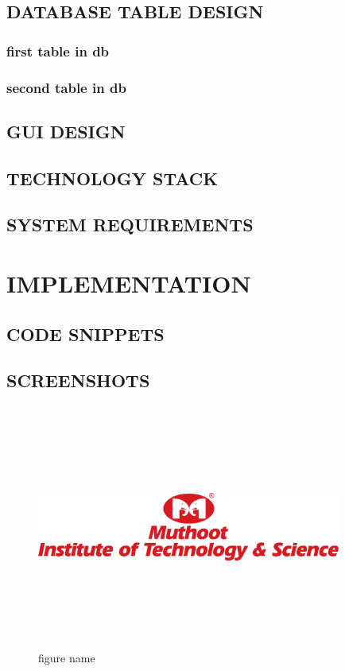 \documentclass[a4paper,12pt,oneside]{report}  %
\begin{document}
  
\newpage
\section{DATABASE TABLE DESIGN}
\subsection{first table in db}

\subsection{second table in db}




\section{GUI DESIGN}

\section{TECHNOLOGY STACK}

\section{SYSTEM REQUIREMENTS}


\chapter{IMPLEMENTATION}
\vspace{-1 cm}

\section{CODE SNIPPETS}
\noindent

\newpage

\section{SCREENSHOTS}
\renewcommand\thefigure{\thechapter.\arabic{figure}}
\begin{figure}[hbtp]
\centering
\includegraphics[height=8cm,width=10cm]{MITS.png}  
\caption{figure name}
\label{fig1} 
\end{figure}
\end{document}
